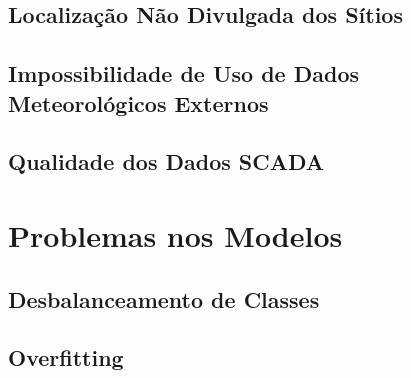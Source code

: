 \documentclass[12pt,a4paper]{article}
\begin{document}
\subsection{Localização Não Divulgada dos Sítios}

\subsection{Impossibilidade de Uso de Dados Meteorológicos Externos}

\subsection{Qualidade dos Dados SCADA}


\section{Problemas nos Modelos}

\subsection{Desbalanceamento de Classes}

\subsection{Overfitting}

\end{document}
